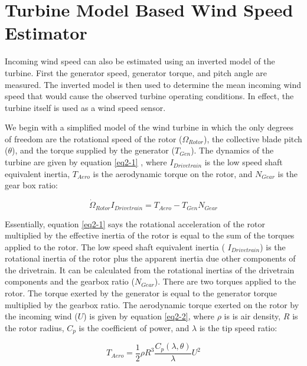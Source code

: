 
\section{Turbine Model Based Wind Speed Estimator} \label{section2-4} 

Incoming wind speed can also be estimated using an inverted model of the turbine.  First the generator speed, generator torque, and pitch angle are measured.  The inverted model is then used to determine the mean incoming wind speed that would cause the observed turbine operating conditions.  In effect, the turbine itself is used as a wind speed sensor. \cite{ostergaard2007,vanderhooft2004,schlipf2014}

We begin with a simplified model of the wind turbine in which the only degrees of freedom are the rotational speed of the rotor ($\Omega _{Rotor}$), the collective blade pitch ($\theta$), and the torque supplied by the generator ($T_{Gen}$).  The dynamics of the turbine are given by equation \ref{eq2-1} , where $I_{Drivetrain}$ is the low speed shaft equivalent inertia, $T_{Aero}$ is the aerodynamic torque on the rotor, and $N_{Gear}$ is the gear box ratio:

\begin{equation}
	\dot{\Omega }_{Rotor}I_{Drivetrain}=T_{Aero}-T_{Gen}N_{Gear} \label{eq2-1}
\end{equation}

Essentially, equation  \ref{eq2-1} says the rotational acceleration of the rotor multiplied by the effective inertia of the rotor is equal to the sum of the torques applied to the rotor. The low speed shaft equivalent inertia ( $I_{Drivetrain}$) is the rotational inertia of the rotor plus the apparent inertia due other components of the drivetrain. It can be calculated from the rotational inertias of the drivetrain components and the gearbox ratio ($N_{Gear}$). There are two torques applied to the rotor. The torque exerted by the generator is equal to the generator torque multiplied by the gearbox ratio. The aerodynamic torque exerted on the rotor by the incoming wind ($U$) is given by equation \ref{eq2-2}, where $\rho$ is is air density, $R$ is the rotor radius, $C_p$ is the coefficient of power, and $\lambda$ is the tip speed ratio:

\begin{equation}
	T_{Aero}=\frac{1}{2}\rho R^{3}\frac{C_{p}(\lambda,\theta)}{\lambda}U^{2} \label{eq2-2}
\end{equation}

